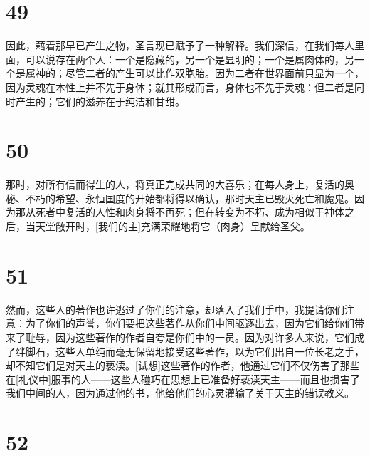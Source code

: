 
\section{49}

因此，藉着那早已产生之物，圣言现已赋予了一种解释。我们深信，在我们每人里面，可以说存在两个人：一个是隐藏的，另一个是显明的；一个是属肉体的，另一个是属神的；尽管二者的产生可以比作双胞胎。因为二者在世界面前只显为一个，因为灵魂在本性上并不先于身体；就其形成而言，身体也不先于灵魂：但二者是同时产生的；它们的滋养在于纯洁和甘甜。\par


\section{50}

那时，对所有信而得生的人，将真正完成共同的大喜乐；在每人身上，复活的奥秘、不朽的希望、永恒国度的开始都将得以确认，那时天主已毁灭死亡和魔鬼。因为那从死者中复活的人性和肉身将不再死；但在转变为不朽、成为相似于神体之后，当天堂敞开时，[我们的主]充满荣耀地将它（肉身）呈献给圣父。\par


\section{51}

然而，这些人的著作也许逃过了你们的注意，却落入了我们手中，我提请你们注意：为了你们的声誉，你们要把这些著作从你们中间驱逐出去，因为它们给你们带来了耻辱，因为这些著作的作者自夸是你们中的一员。因为对许多人来说，它们成了绊脚石，这些人单纯而毫无保留地接受这些著作，以为它们出自一位长老之手，却不知它们是对天主的亵渎。[试想]这些著作的作者，他通过它们不仅伤害了那些在[礼仪中]服事的人——这些人碰巧在思想上已准备好亵渎天主——而且也损害了我们中间的人，因为通过他的书，他给他们的心灵灌输了关于天主的错误教义。\par


\section{52}

